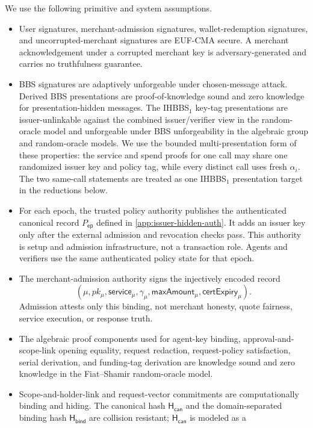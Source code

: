 \documentclass[letterpaper]{article}
\newcommand{\hash}{\mathsf{H}_{\mathsf{can}}}
\newcommand{\hashBind}{\mathsf{H}_{\mathsf{bind}}}
\begin{document}
We use the following primitive and system assumptions.
\begin{itemize}
  \item User signatures, merchant-admission signatures, wallet-redemption
  signatures, and uncorrupted-merchant signatures are EUF-CMA secure. A
  merchant acknowledgement under a corrupted merchant key is adversary-generated and
  carries no truthfulness guarantee.
  \item BBS signatures are adaptively unforgeable under chosen-message attack.
  Derived BBS presentations are proof-of-knowledge sound and zero knowledge for
  presentation-hidden messages. The
  IHBBS\(_1\) key-tag presentations are issuer-unlinkable against the combined
  issuer/verifier view in the random-oracle model and unforgeable under BBS
  unforgeability in the algebraic group and random-oracle models. We use the
  bounded multi-presentation form of these properties: the service and spend
  proofs for one call may share one randomized issuer key and policy tag, while
  every distinct call uses fresh \(\alpha_i\). The two same-call statements are
  treated as one IHBBS\(_1\) presentation target in the reductions below.
  \item For each epoch, the trusted policy authority publishes the authenticated
  canonical record \(P_{\mathsf{ep}}\) defined in
  \cref{app:issuer-hidden-auth}. It adds an issuer key only after the
  external admission and revocation checks pass. This authority is setup and
  admission infrastructure, not a transaction role. Agents and verifiers use
  the same authenticated policy state for that epoch.
  \item The merchant-admission authority signs the injectively encoded record
  \[
    (\mu,pk_\mu,\mathsf{service}_\mu,\gamma_\mu,
      \mathsf{maxAmount}_\mu,\mathsf{certExpiry}_\mu).
  \]
  Admission attests only this binding, not merchant honesty, quote fairness,
  service execution, or response truth.
  \item The algebraic proof components used for agent-key binding,
  approval-and-scope-link opening equality, request redaction, request-policy
  satisfaction, serial derivation, and funding-tag derivation are knowledge
  sound and zero knowledge in the Fiat--Shamir random-oracle model.
  \item Scope-and-holder-link and request-vector commitments are computationally
  binding and hiding. The canonical hash \(\hash\) and the domain-separated
  binding hash \(\hashBind\) are collision resistant; \(\hash\) is modeled as a

\end{itemize}
\end{document}
